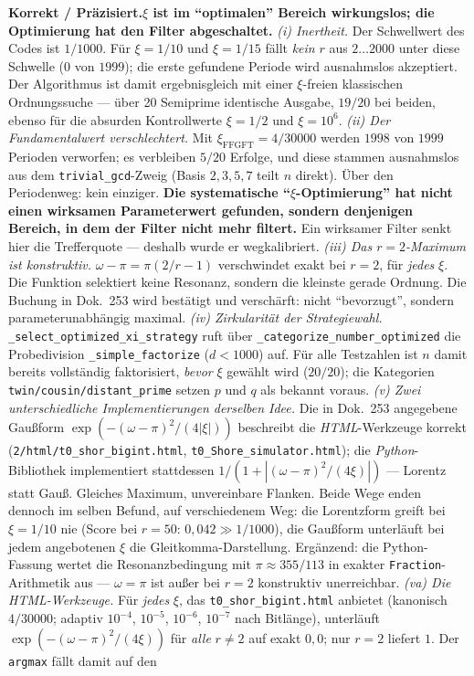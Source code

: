 \smallskip\noindent\textbf{Korrekt / Präzisiert.}\quad \textbf{$\xi$ ist im \enquote{optimalen} Bereich wirkungslos; die   Optimierung hat den Filter abgeschaltet.}   \emph{(i) Inertheit.} Der Schwellwert des Codes ist $1/1000$. Für   $\xi = 1/10$ und $\xi = 1/15$ fällt \emph{kein} $r$ aus $2\ldots 2000$   unter diese Schwelle ($0$ von $1999$); die erste gefundene Periode wird   ausnahmslos akzeptiert. Der Algorithmus ist damit ergebnisgleich mit   einer $\xi$-freien klassischen Ordnungssuche --- über 20 Semiprime   identische Ausgabe, $19/20$ bei beiden, ebenso für die absurden   Kontrollwerte $\xi = 1/2$ und $\xi = 10^6$.   \emph{(ii) Der Fundamentalwert verschlechtert.} Mit   $\xi_\text{FFGFT} = 4/30000$ werden $1998$ von $1999$ Perioden verworfen;   es verbleiben $5/20$ Erfolge, und diese stammen ausnahmslos aus dem   \texttt{trivial\_gcd}-Zweig (Basis $2,3,5,7$ teilt $n$ direkt). Über den   Periodenweg: kein einziger. \textbf{Die systematische   \enquote{$\xi$-Optimierung} hat nicht einen wirksamen Parameterwert   gefunden, sondern denjenigen Bereich, in dem der Filter nicht mehr   filtert.} Ein wirksamer Filter senkt hier die Trefferquote --- deshalb   wurde er wegkalibriert.   \emph{(iii) Das $r=2$-Maximum ist konstruktiv.} $\omega - \pi =   \pi(2/r - 1)$ verschwindet exakt bei $r = 2$, für \emph{jedes} $\xi$.   Die Funktion selektiert keine Resonanz, sondern die kleinste gerade   Ordnung. Die Buchung in Dok.~253 wird bestätigt und verschärft: nicht   \enquote{bevorzugt}, sondern parameterunabhängig maximal.   \emph{(iv) Zirkularität der Strategiewahl.}   \texttt{\_\allowbreak select\_\allowbreak optimized\_\allowbreak xi\_\allowbreak strategy} ruft über   \texttt{\_\allowbreak categorize\_\allowbreak number\_\allowbreak optimized} die Probedivision   \texttt{\_simple\_factorize} ($d < 1000$) auf. Für alle Testzahlen ist   $n$ damit bereits vollständig faktorisiert, \emph{bevor} $\xi$ gewählt   wird ($20/20$); die Kategorien \texttt{twin/\allowbreak cousin/\allowbreak distant\_\allowbreak prime}   setzen $p$ und $q$ als bekannt voraus.   \emph{(v) Zwei unterschiedliche Implementierungen derselben Idee.}   Die in Dok.~253 angegebene Gau\ss{}form $\exp(-(\omega-\pi)^2/(4|\xi|))$   beschreibt die \emph{HTML}-Werkzeuge korrekt   (\texttt{2/html/t0\_shor\_bigint.html},   \texttt{t0\_Shore\_simulator.html}); die \emph{Python}-Bibliothek   implementiert stattdessen $1/(1 + |(\omega-\pi)^2/(4\xi)|)$ --- Lorentz   statt Gau\ss{}. Gleiches Maximum, unvereinbare Flanken. Beide Wege enden   dennoch im selben Befund, auf verschiedenem Weg: die Lorentzform greift   bei $\xi = 1/10$ nie (Score bei $r = 50$: $0{,}042 \gg 1/1000$), die   Gau\ss{}form unterl\"auft bei jedem angebotenen $\xi$ die   Gleitkomma-Darstellung. Erg\"anzend: die Python-Fassung wertet die   Resonanzbedingung mit $\pi \approx 355/113$ in exakter   \texttt{Fraction}-Arithmetik aus --- $\omega = \pi$ ist au\ss{}er bei   $r = 2$ konstruktiv unerreichbar.   \emph{(va) Die HTML-Werkzeuge.} F\"ur \emph{jedes} $\xi$, das   \texttt{t0\_shor\_bigint.html} anbietet (kanonisch $4/30000$; adaptiv   $10^{-4}$, $10^{-5}$, $10^{-6}$, $10^{-7}$ nach Bitl\"ange), unterl\"auft   $\exp(-(\omega-\pi)^2/(4\xi))$ f\"ur \emph{alle} $r \neq 2$ auf exakt   $0{,}0$; nur $r = 2$ liefert $1$. Der \texttt{argmax} f\"allt damit auf   den 